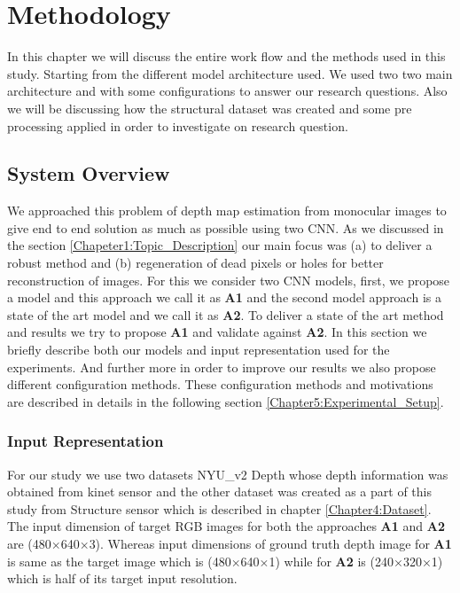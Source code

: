 
\chapter{Methodology}

\label{Chapter5:Methodology} 

In this chapter we will discuss the entire work flow and the methods used in this study. Starting from the different model architecture used. We used two two main architecture and with some configurations to answer our research questions. Also we will be discussing how the structural dataset was created and some pre processing applied in order to investigate on research question.


\section{System Overview}
We approached this problem of depth map estimation from monocular images to give end to end solution as much as possible using two CNN. As we discussed in the section \ref{Chapeter1:Topic_Description} our main focus was (a) to deliver a robust method and (b) regeneration of dead pixels or holes for better reconstruction of images. For this we consider two CNN models, first, we propose a model and this approach we call it as \textbf{A1} and the second model approach is a state of the art model and we call it as \textbf{A2}. To deliver a state of the art method and results we try to propose \textbf{A1} and validate against \textbf{A2}. In this section we briefly describe both our models and input representation used for the experiments. And further more in order to improve our results we also propose different configuration methods. These configuration methods and motivations are described in details in the following section \ref{Chapter5:Experimental_Setup}. 


\subsection{Input Representation}
For our study we use two datasets NYU\_v2 Depth \cite{silberman11indoor} whose depth information was obtained from kinet sensor and the other dataset was created as a part of this study from Structure sensor which is described in chapter \ref{Chapter4:Dataset}. The input dimension of target RGB images for both the approaches \textbf{A1} and \textbf{A2} are (480$\times$640$\times$3). Whereas input dimensions of ground truth depth image for \textbf{A1} is same as the target image  which is (480$\times$640$\times$1) while for \textbf{A2} is  (240$\times$320$\times$1) which is half of its target input resolution.

